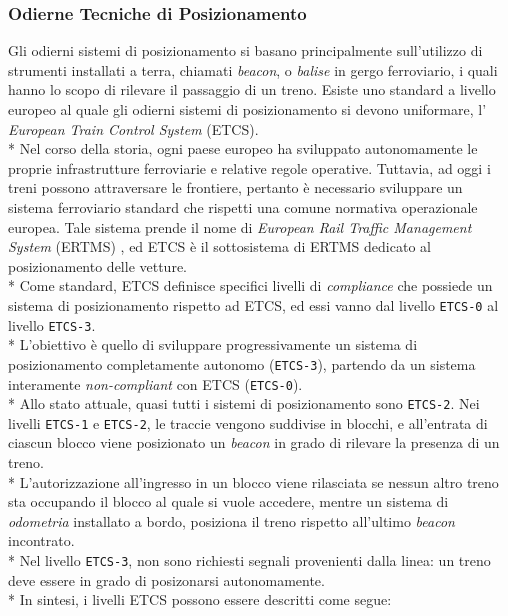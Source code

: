 \subsubsection{Odierne Tecniche di Posizionamento}
Gli odierni sistemi di posizionamento si basano principalmente sull'utilizzo di strumenti installati a terra, chiamati \emph{beacon}, o \emph{balise} in gergo ferroviario, i quali hanno lo scopo di rilevare il passaggio di un treno.\cite{tecnicheodierne}
Esiste uno standard a livello europeo al quale gli odierni sistemi di posizionamento si devono uniformare, l' \emph{European Train Control System} (ETCS).\\*
Nel corso della storia, ogni paese europeo ha sviluppato autonomamente le proprie infrastrutture ferroviarie e relative regole operative. Tuttavia, ad oggi i treni possono attraversare le frontiere, pertanto \`e necessario sviluppare un sistema ferroviario standard che rispetti una comune normativa operazionale europea. Tale sistema prende il nome di \emph{European Rail Traffic Management System} (ERTMS) \cite{ertms}, ed ETCS \`e il sottosistema di ERTMS dedicato al posizionamento delle vetture.\\*
Come standard, ETCS definisce specifici livelli di \emph{compliance} che possiede un sistema di posizionamento rispetto ad ETCS, ed essi vanno dal livello \texttt{ETCS-0} al livello \texttt{ETCS-3}. \cite{svolta}
\\*
L'obiettivo \`e quello di sviluppare progressivamente un sistema di posizionamento completamente autonomo (\texttt{ETCS-3}), partendo da un sistema interamente \emph{non-compliant} con ETCS (\texttt{ETCS-0}).
\\*
Allo stato attuale, quasi tutti i sistemi di posizionamento sono \texttt{ETCS-2}. Nei livelli \texttt{ETCS-1} e \texttt{ETCS-2}, le traccie vengono suddivise in blocchi, e all'entrata di ciascun blocco viene posizionato un \emph{beacon} in grado di rilevare la presenza di un treno.\\*
L'autorizzazione all'ingresso in un blocco viene rilasciata se nessun altro treno sta occupando il blocco al quale si vuole accedere, mentre un sistema di \emph{odometria} installato a bordo, posiziona il treno rispetto all'ultimo \emph{beacon} incontrato.\\*
Nel livello \texttt{ETCS-3}, non sono richiesti segnali provenienti dalla linea: un treno deve essere in grado di posizonarsi autonomamente. \cite{etcs3}\\*
In sintesi, i livelli ETCS possono essere descritti come segue:
